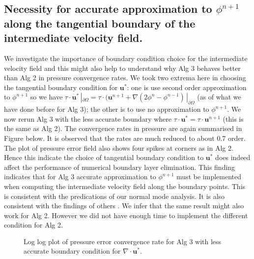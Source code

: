 \subsection*{Necessity for accurate approximation to $\phi^{n+1}$ along the tangential boundary of the intermediate velocity field.}
We investigate the importance of boundary condition choice for the intermediate velocity field and this might also help to understand why Alg 3 behaves better than Alg 2 in pressure convergence rates. We took two extrema here in choosing the tangential boundary condition for $\textbf{u}^*$: one is use second order approximation to $\phi^{n+1}$ so we have $\textbf{$\tau$} \cdot \textbf{u}^* \,|_{\partial \Omega} = \textbf{$\tau$} \cdot (\textbf{u}^{n+1} + \nabla (2\phi^n - \phi^{n-1})\,|_{\partial \Omega}$ (as of what we have done before for Alg 3); the other is to use no approximation to $\phi^{n+1}$. We now rerun Alg 3 with the less accurate boundary where $\textbf{$\tau$} \cdot \textbf{u}^* = \textbf{$\tau$} \cdot \textbf{u}^{n+1}$ (this is the same as Alg 2). The convergence rates in pressure are again summarised in Figure below. It is observed that the rates are much reduced to about 0.7 order. The plot of pressure error field also shows four spikes at corners as in Alg 2. Hence this indicate the choice of tangential boundary condition to $\textbf{u}^*$ does indeed affect the performance of numerical boundary layer elimination. This finding indicates that for Alg 3 accurate approximation to $\phi^{n+1}$ must be implemented when computing the intermediate velocity field along the boundary points. This is consistent with the predications of our normal mode analysis. It is also consistent with the findings of others \cite{brown2001accurate}. We infer that the same result might also work for Alg 2. However we did not have enough time to implement the different condition for Alg 2.

\begin{figure}[H]
	\centering
	\caption{Log log plot of pressure error convergence rate for Alg 3 with less accurate boundary condition for $\nabla \cdot \textbf{u}^*$. }\label{fig:6.20}
\end{figure}
	
